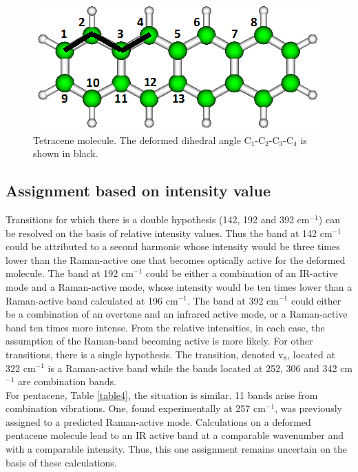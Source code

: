 \begin{figure}[h]
	\centering
	\includegraphics[scale=0.6]{image/Tetracene-def}
	\caption[The deformed dihedral angle C$_{1}$-C$_{2}$-C$_{3}$-C$_{4}$ in Tetracene molecule]{Tetracene molecule. The deformed dihedral angle C$_{1}$-C$_{2}$-C$_{3}$-C$_{4}$ is shown in black.} \label{figure3}
\end{figure}

\subsection*{Assignment based on intensity value}

Transitions for which there is a double hypothesis (142, 192 and 392 cm$^{-1}$) can be resolved on the basis of relative intensity values. Thus the band at 142 cm$^{-1}$ could be attributed to a second harmonic whose intensity would be three times lower than the Raman-active one that becomes optically active for the deformed molecule. The band at 192 cm$^{-1}$ could be either a combination of an IR-active mode and a Raman-active mode, whose intensity would be ten times lower than a Raman-active band calculated at 196 cm$^{-1}$. The band at 392 cm$^{-1}$ could either be a combination of an overtone and an infrared active mode, or a Raman-active band ten times more intense. From the relative intensities, in each case, the assumption of the Raman-band becoming active is more likely. For other transitions, there is a single hypothesis. The transition, denoted v$_{8}$, located at 322 cm$^{-1}$ is a Raman-active band while the bands located at 252, 306 and 342 cm$^{-1}$ are combination bands.\\ 

For pentacene, Table \ref{table4}, the situation is similar. 11 bands arise from combination vibrations. One, found experimentally at 257 cm$^{-1}$, was previously assigned to a predicted Raman-active mode. Calculations on a deformed pentacene molecule lead to an IR active band at a comparable wavenumber and with a comparable intensity. Thus, this one assignment remains uncertain on the basis of these calculations. 

